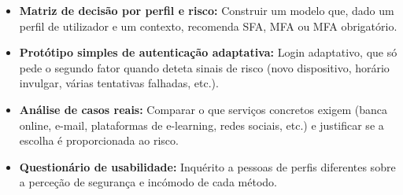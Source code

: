 \begin{itemize}[leftmargin=2cm]
    \item \textbf{Matriz de decisão por perfil e risco:} Construir um modelo que, dado um perfil de utilizador e um contexto, recomenda SFA, MFA ou MFA obrigatório.

    \item \textbf{Protótipo simples de autenticação adaptativa:} Login adaptativo, que só pede o segundo fator quando deteta sinais de risco (novo dispositivo, horário invulgar, várias tentativas falhadas, etc.).

    \item \textbf{Análise de casos reais:} Comparar o que serviços concretos exigem (banca online, e-mail, plataformas de e-learning, redes sociais, etc.) e justificar se a escolha é proporcionada ao risco.

    \item \textbf{Questionário de usabilidade:}  Inquérito a pessoas de perfis diferentes sobre a perceção de segurança e incómodo de cada método.
\end{itemize}